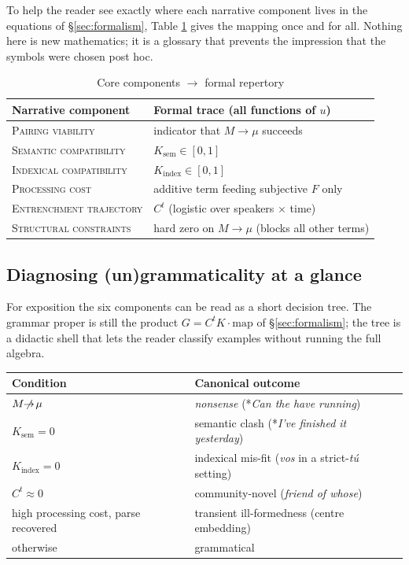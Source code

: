 \documentclass[12pt,letterpaper]{article}
\begin{document}
\bigskip
\noindent
To help the reader see exactly where each narrative component lives in
the equations of §\ref{sec:formalism}, Table \ref{tab:vars} gives the
mapping once and for all.  Nothing here is new mathematics; it is a
glossary that prevents the impression that the symbols were chosen
post hoc.

\begin{table}[h]
\centering
\caption{Core components $\rightarrow$ formal repertory}
\label{tab:vars}
\begin{tabular}{@{}ll@{}}
\toprule
Narrative component & Formal trace (all functions of $u$)\\
\midrule
\textsc{Pairing viability}
        & indicator that $M\!\to\!\mu$ succeeds\\
\textsc{Semantic compatibility}
        & $K_{\text{sem}}\in[0,1]$\\
\textsc{Indexical compatibility}
        & $K_{\text{index}}\in[0,1]$\\
\textsc{Processing cost}
        & additive term feeding subjective $F$ only\\
\textsc{Entrenchment trajectory}
        & $C^{t}$ (logistic over speakers $\times$ time)\\
\textsc{Structural constraints}
        & hard zero on $M\!\to\!\mu$ (blocks all other terms)\\
\bottomrule
\end{tabular}
\end{table}

\vspace*{-1ex}  %


\subsection{Diagnosing (un)grammaticality at a glance}
\label{sec:diag-tree}

For exposition the six components can be read as a short decision
tree. The grammar proper is still the product
$G=C^{t}K \cdot\text{map}$ of §\ref{sec:formalism}; the tree is a
didactic shell that lets the reader classify examples without running
the full algebra.

\begin{center}
\begin{tabular}{@{}l@{\;$\longrightarrow$\;}l@{}}
\toprule
Condition & Canonical outcome\\
\midrule
$M\!\not\!\to\!\mu$ &
\emph{nonsense} (*\textit{Can the have running})\\[4pt]
$K_{\text{sem}}=0$ &
semantic clash (*\textit{I’ve finished it yesterday})\\[4pt]
$K_{\text{index}}=0$ &
indexical mis-fit (\textit{vos} in a strict-\textit{tú} setting)\\[4pt]
$C^{t}\approx0$ &
community-novel (\textit{friend of whose})\\[4pt]
high processing cost, parse recovered &
transient ill-formedness (centre embedding)\\[4pt]
otherwise &
grammatical\\
\bottomrule
\end{tabular}
\end{center}
\end{document}
